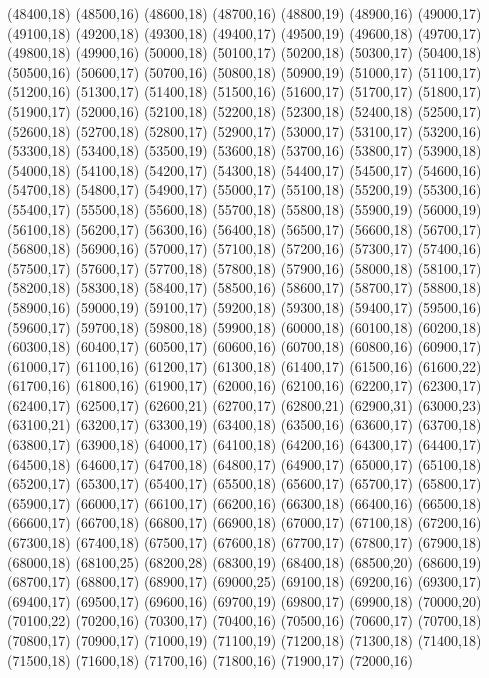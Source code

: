(48400,18)
(48500,16)
(48600,18)
(48700,16)
(48800,19)
(48900,16)
(49000,17)
(49100,18)
(49200,18)
(49300,18)
(49400,17)
(49500,19)
(49600,18)
(49700,17)
(49800,18)
(49900,16)
(50000,18)
(50100,17)
(50200,18)
(50300,17)
(50400,18)
(50500,16)
(50600,17)
(50700,16)
(50800,18)
(50900,19)
(51000,17)
(51100,17)
(51200,16)
(51300,17)
(51400,18)
(51500,16)
(51600,17)
(51700,17)
(51800,17)
(51900,17)
(52000,16)
(52100,18)
(52200,18)
(52300,18)
(52400,18)
(52500,17)
(52600,18)
(52700,18)
(52800,17)
(52900,17)
(53000,17)
(53100,17)
(53200,16)
(53300,18)
(53400,18)
(53500,19)
(53600,18)
(53700,16)
(53800,17)
(53900,18)
(54000,18)
(54100,18)
(54200,17)
(54300,18)
(54400,17)
(54500,17)
(54600,16)
(54700,18)
(54800,17)
(54900,17)
(55000,17)
(55100,18)
(55200,19)
(55300,16)
(55400,17)
(55500,18)
(55600,18)
(55700,18)
(55800,18)
(55900,19)
(56000,19)
(56100,18)
(56200,17)
(56300,16)
(56400,18)
(56500,17)
(56600,18)
(56700,17)
(56800,18)
(56900,16)
(57000,17)
(57100,18)
(57200,16)
(57300,17)
(57400,16)
(57500,17)
(57600,17)
(57700,18)
(57800,18)
(57900,16)
(58000,18)
(58100,17)
(58200,18)
(58300,18)
(58400,17)
(58500,16)
(58600,17)
(58700,17)
(58800,18)
(58900,16)
(59000,19)
(59100,17)
(59200,18)
(59300,18)
(59400,17)
(59500,16)
(59600,17)
(59700,18)
(59800,18)
(59900,18)
(60000,18)
(60100,18)
(60200,18)
(60300,18)
(60400,17)
(60500,17)
(60600,16)
(60700,18)
(60800,16)
(60900,17)
(61000,17)
(61100,16)
(61200,17)
(61300,18)
(61400,17)
(61500,16)
(61600,22)
(61700,16)
(61800,16)
(61900,17)
(62000,16)
(62100,16)
(62200,17)
(62300,17)
(62400,17)
(62500,17)
(62600,21)
(62700,17)
(62800,21)
(62900,31)
(63000,23)
(63100,21)
(63200,17)
(63300,19)
(63400,18)
(63500,16)
(63600,17)
(63700,18)
(63800,17)
(63900,18)
(64000,17)
(64100,18)
(64200,16)
(64300,17)
(64400,17)
(64500,18)
(64600,17)
(64700,18)
(64800,17)
(64900,17)
(65000,17)
(65100,18)
(65200,17)
(65300,17)
(65400,17)
(65500,18)
(65600,17)
(65700,17)
(65800,17)
(65900,17)
(66000,17)
(66100,17)
(66200,16)
(66300,18)
(66400,16)
(66500,18)
(66600,17)
(66700,18)
(66800,17)
(66900,18)
(67000,17)
(67100,18)
(67200,16)
(67300,18)
(67400,18)
(67500,17)
(67600,18)
(67700,17)
(67800,17)
(67900,18)
(68000,18)
(68100,25)
(68200,28)
(68300,19)
(68400,18)
(68500,20)
(68600,19)
(68700,17)
(68800,17)
(68900,17)
(69000,25)
(69100,18)
(69200,16)
(69300,17)
(69400,17)
(69500,17)
(69600,16)
(69700,19)
(69800,17)
(69900,18)
(70000,20)
(70100,22)
(70200,16)
(70300,17)
(70400,16)
(70500,16)
(70600,17)
(70700,18)
(70800,17)
(70900,17)
(71000,19)
(71100,19)
(71200,18)
(71300,18)
(71400,18)
(71500,18)
(71600,18)
(71700,16)
(71800,16)
(71900,17)
(72000,16)
